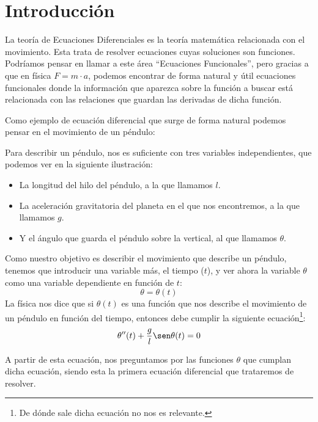 \chapter{Introducción}

La teoría de Ecuaciones Diferenciales es la teoría matemática relacionada con el movimiento. Esta trata de resolver ecuaciones cuyas soluciones son funciones. Podríamos pensar en llamar a este área ``Ecuaciones Funcionales'', pero gracias a que en física $F = m \cdot a$, podemos encontrar de forma natural y útil ecuaciones funcionales donde la información que aparezca sobre la función a buscar está relacionada con las relaciones que guardan las derivadas de dicha función.

\begin{ejemplo}
    Como ejemplo de ecuación diferencial que surge de forma natural podemos pensar en el movimiento de un péndulo:

    Para describir un péndulo, nos es suficiente con tres variables independientes, que podemos ver en la siguiente ilustración:
    \begin{itemize}
        \item La longitud del hilo del péndulo, a la que llamamos $l$.
        \item La aceleración gravitatoria del planeta en el que nos encontremos, a la que llamamos $g$.
        \item Y el ángulo que guarda el péndulo sobre la vertical, al que llamamos $\theta$.
    \end{itemize}


    Como nuestro objetivo es describir el movimiento que describe un péndulo, tenemos que introducir una variable más, el tiempo ($t$), y ver ahora la variable $\theta$ como una variable dependiente en función de $t$:
    \begin{equation*}
        \theta = \theta(t)
    \end{equation*}
    La física nos dice que si $\theta(t)$ es una función que nos describe el movimiento de un péndulo en función del tiempo, entonces debe cumplir la siguiente ecuación\footnote{De dónde sale dicha ecuación no nos es relevante.}:
    \begin{equation}\label{eq:pendulo}
        \theta''(t) + \frac{g}{l} \sen \theta(t) = 0
    \end{equation}

    A partir de esta ecuación, nos preguntamos por las funciones $\theta$ que cumplan dicha ecuación, siendo esta la primera ecuación diferencial que trataremos de resolver.


\end{ejemplo}
